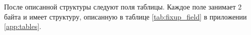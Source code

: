 После описанной структуры следуют поля таблицы. Каждое поле занимает 2 байта и
имеет структуру, описанную в таблице \ref{tab:fixup_field} в приложении
\ref{app:tables}.


